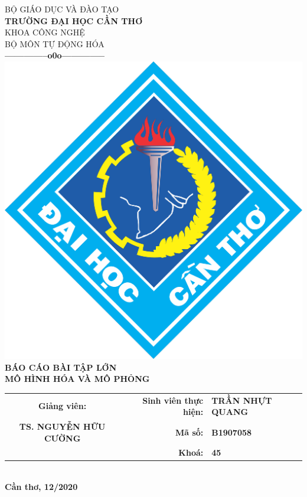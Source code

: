 \documentclass{standalone}
\begin{document}
\begin{titlepage}

\begin{center}
	{BỘ GIÁO DỤC VÀ ĐÀO TẠO}\\
	\textbf{TRƯỜNG ĐẠI HỌC CẦN THƠ}\\
	{KHOA CÔNG NGHỆ}\\
	{BỘ MÔN TỰ ĐỘNG HÓA}\\
	\textbf{--------------o0o--------------}\\[1.5cm]
	\includegraphics[scale=.15]{images/ctu-logo}\\[3.5cm]
	
	{\large \bf BÁO CÁO BÀI TẬP LỚN}\\[0.5cm]
	{\LARGE \textbf{MÔ HÌNH HÓA VÀ MÔ PHỎNG}}\\[2cm]
	

	\begin{tabular}{ c c r l }
	 \textbf{Giảng viên:} & & \textbf{Sinh viên thực hiện:} & \textbf{TRẦN NHỰT QUANG}\\ 
	 \textbf{TS. NGUYỄN HỮU CƯỜNG} & & \textbf{Mã số:} & \textbf{B1907058}\\  
	 & & \textbf{Khoá:} & \textbf{45}
	\end{tabular}\\[3cm]
	\textbf{Cần thơ, 12/2020}
\end{center}

\end{titlepage}
\end{document}
